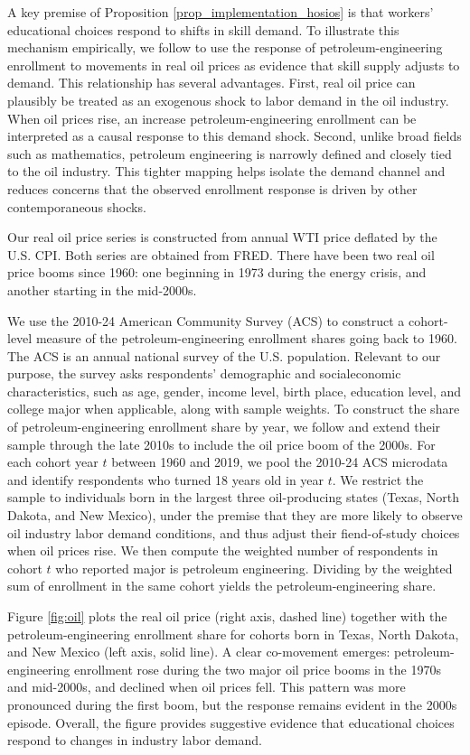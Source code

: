 \documentclass[12pt]{article} %
\theoremstyle{definition}
\begin{document}
A key premise of Proposition \ref{prop_implementation_hosios} is that workers' educational choices respond to shifts in skill demand. To illustrate this mechanism empirically, we follow \cite{han2020industry} to use the response of petroleum-engineering enrollment to movements in real oil prices as evidence that skill supply adjusts to demand.  This relationship has several advantages. 
First, real oil price can plausibly be treated as an  exogenous shock to labor demand in the oil industry. When oil prices rise, an increase petroleum-engineering enrollment can be interpreted as a causal  response to this demand shock.  Second, unlike broad fields such as mathematics, petroleum engineering is narrowly defined and closely tied to the oil industry. This tighter mapping helps isolate the demand channel and reduces concerns that the observed enrollment response is driven by other contemporaneous  shocks. 


Our real oil price series is constructed from annual WTI price deflated by the U.S. CPI. Both series are obtained from FRED. There have been two real oil price booms since 1960: one beginning in 1973 during the energy crisis,  and another starting in the mid-2000s. 

We use the 2010-24  American Community Survey (ACS) to construct  a cohort-level measure of the petroleum-engineering enrollment shares going back to 1960. The ACS is an annual national survey of the U.S. population. Relevant to our purpose, the survey asks respondents' demographic and socialeconomic characteristics, such as age, gender, income level, birth place, education level, and college major when applicable, along with sample weights. To construct the share of petroleum-engineering  enrollment share by year, we follow \cite{han2020industry} and extend their sample through the late 2010s to include the oil price boom of the 2000s.   
For each cohort year $t$ between 1960 and 2019, we pool the 2010-24 ACS microdata and identify respondents who turned 18 years old in year $t$. We restrict the sample to individuals born in the largest three oil-producing states (Texas, North Dakota, and New Mexico), under the premise that they are more likely to observe oil industry labor demand conditions, and thus  adjust their fiend-of-study choices when oil prices rise. 
We then compute the weighted number of respondents in cohort $t$ who reported major is petroleum engineering.  Dividing by the weighted sum of enrollment in the same cohort yields the petroleum-engineering share. 


Figure \ref{fig:oil} plots the real oil price (right axis, dashed line) together with the  petroleum-engineering enrollment share for cohorts born in Texas, North Dakota, and New Mexico (left axis, solid line).   A clear co-movement emerges: petroleum-engineering enrollment rose during the two major oil price booms in the 1970s and mid-2000s, and declined when oil prices fell. This pattern was more pronounced during the first boom, but the response remains evident in the  2000s episode. Overall, the figure provides suggestive evidence that educational choices respond to changes in industry labor demand.
\end{document}
